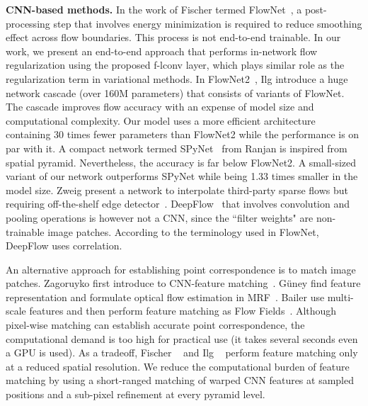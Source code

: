 \documentclass[10pt,twocolumn,letterpaper]{article}
\begin{document}
\vspace{0.1cm}
\noindent \textbf{CNN-based methods.} In the work of Fischer \etal termed FlowNet~\cite{Fischer15}, a post-processing step that involves energy minimization is required to reduce smoothing effect across flow boundaries. This process is not end-to-end trainable. In our work, we present an end-to-end approach that performs in-network flow regularization using the proposed f-lconv layer, which plays similar role as the regularization term in variational methods. 
%
In FlowNet2~\cite{Ilg17}, Ilg \etal introduce a huge network cascade (over 160M parameters) that consists of variants of FlowNet. The cascade improves flow accuracy with an expense of model size and computational complexity. Our model uses a more efficient architecture containing 30 times fewer parameters than FlowNet2 while the performance is on par with it. A compact network termed SPyNet~\cite{Ranjan17} from Ranjan \etal is inspired from spatial pyramid. Nevertheless, the accuracy is far below FlowNet2. A small-sized variant of our network outperforms SPyNet while being 1.33 times smaller in the model size. Zweig \etal present a network to interpolate third-party sparse flows but requiring off-the-shelf edge detector~\cite{Zweig17}. DeepFlow~\cite{Weinzaepfel13} that involves convolution and pooling operations is however not a CNN, since the ``filter weights" are non-trainable image patches. According to the terminology used in FlowNet, DeepFlow uses correlation.

An alternative approach for establishing point correspondence is to match image patches. Zagoruyko \etal first introduce to CNN-feature matching~\cite{Zagoruyko15}. G\"uney \etal find feature representation and formulate optical flow estimation in MRF~\cite{Guney16}. Bailer \etal\cite{Bailer17} use multi-scale features and then perform feature matching as Flow Fields~\cite{Bailer15}. Although pixel-wise matching can establish accurate point correspondence, the computational demand is too high for practical use (it takes several seconds even a GPU is used). As a tradeoff, Fischer \etal~\cite{Fischer15} and Ilg \etal~\cite{Ilg17} perform feature matching only at a reduced spatial resolution. We reduce the computational burden of feature matching by using a short-ranged matching of warped CNN features at sampled positions and a sub-pixel refinement at every pyramid level.
\end{document}
